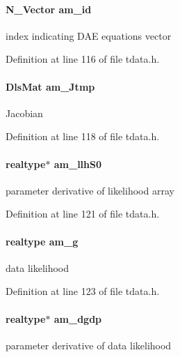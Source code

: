 \paragraph[{am\+\_\+id}]{\setlength{\rightskip}{0pt plus 5cm}N\+\_\+\+Vector am\+\_\+id}\label{struct_temp_data_ad918917fdce710fbd6fe9774e35bfcfb}
index indicating D\+A\+E equations vector 

Definition at line 116 of file tdata.\+h.

\hypertarget{struct_temp_data_aa850cd4b6b24d0b98b4aac8f42a057a1}{}
\paragraph[{am\+\_\+\+Jtmp}]{\setlength{\rightskip}{0pt plus 5cm}Dls\+Mat am\+\_\+\+Jtmp}\label{struct_temp_data_aa850cd4b6b24d0b98b4aac8f42a057a1}
Jacobian 

Definition at line 118 of file tdata.\+h.

\hypertarget{struct_temp_data_ac8e571186f15f3172f69d2e016023fbc}{}
\paragraph[{am\+\_\+llh\+S0}]{\setlength{\rightskip}{0pt plus 5cm}realtype$\ast$ am\+\_\+llh\+S0}\label{struct_temp_data_ac8e571186f15f3172f69d2e016023fbc}
parameter derivative of likelihood array 

Definition at line 121 of file tdata.\+h.

\hypertarget{struct_temp_data_abcec297db6f0e216e479c6f4f2cdb5ff}{}
\paragraph[{am\+\_\+g}]{\setlength{\rightskip}{0pt plus 5cm}realtype am\+\_\+g}\label{struct_temp_data_abcec297db6f0e216e479c6f4f2cdb5ff}
data likelihood 

Definition at line 123 of file tdata.\+h.

\hypertarget{struct_temp_data_a081b11391c89402abac604021f6ccf9d}{}
\paragraph[{am\+\_\+dgdp}]{\setlength{\rightskip}{0pt plus 5cm}realtype$\ast$ am\+\_\+dgdp}\label{struct_temp_data_a081b11391c89402abac604021f6ccf9d}
parameter derivative of data likelihood 

